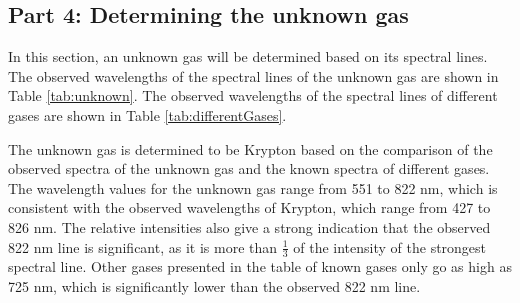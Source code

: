 \subsection{Part 4: Determining the unknown gas}

In this section, an unknown gas will be determined based on its spectral lines.
The observed wavelengths of the spectral lines of the unknown gas are shown in Table \ref{tab:unknown}.
The observed wavelengths of the spectral lines of different gases are shown in Table \ref{tab:differentGases}.

The unknown gas is determined to be Krypton based on the comparison of the observed spectra of the unknown gas and the known spectra of different gases.
The wavelength values for the unknown gas range from 551 to 822 nm, which is consistent with the observed wavelengths of Krypton, which range from 427 to 826 nm.
The relative intensities also give a strong indication that the observed 822 nm line is significant, as it is more than $\frac{1}{3}$ of the intensity of the
strongest spectral line.
Other gases presented in the table of known gases only go as high as 725 nm, which is significantly lower than the observed 822 nm line.

